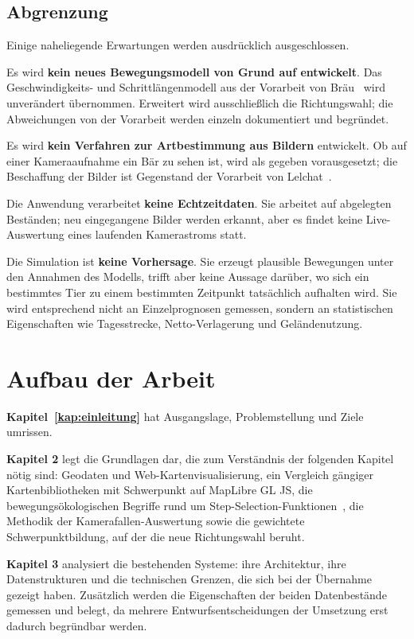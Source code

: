 \documentclass[12pt,a4paper]{scrreprt}
\begin{document}
\subsection*{Abgrenzung}

Einige naheliegende Erwartungen werden ausdrücklich ausgeschlossen.

Es wird \textbf{kein neues Bewegungsmodell von Grund auf entwickelt}.
Das Geschwindigkeits- und Schrittlängenmodell aus der Vorarbeit von
Bräu~\cite{braeu2025} wird unverändert übernommen. Erweitert wird
ausschließlich die Richtungswahl; die Abweichungen von der Vorarbeit
werden einzeln dokumentiert und begründet.

Es wird \textbf{kein Verfahren zur Artbestimmung aus Bildern}
entwickelt. Ob auf einer Kameraaufnahme ein Bär zu sehen ist, wird als
gegeben vorausgesetzt; die Beschaffung der Bilder ist Gegenstand der
Vorarbeit von Lelchat~\cite{lelchat2026}.

Die Anwendung verarbeitet \textbf{keine Echtzeitdaten}. Sie arbeitet
auf abgelegten Beständen; neu eingegangene Bilder werden erkannt, aber
es findet keine Live-Auswertung eines laufenden Kamerastroms statt.

Die Simulation ist \textbf{keine Vorhersage}. Sie erzeugt plausible
Bewegungen unter den Annahmen des Modells, trifft aber keine Aussage
darüber, wo sich ein bestimmtes Tier zu einem bestimmten Zeitpunkt
tatsächlich aufhalten wird. Sie wird entsprechend nicht an
Einzelprognosen gemessen, sondern an statistischen Eigenschaften wie
Tagesstrecke, Netto-Verlagerung und Geländenutzung.

\section{Aufbau der Arbeit}
\label{sec:aufbau}

\textbf{Kapitel~\ref{kap:einleitung}} hat Ausgangslage, Problemstellung
und Ziele umrissen.

\textbf{Kapitel 2} legt die Grundlagen dar, die zum Verständnis der
folgenden Kapitel nötig sind: Geodaten und Web-Kartenvisualisierung,
ein Vergleich gängiger Kartenbibliotheken mit Schwerpunkt auf MapLibre
GL JS, die bewegungsökologischen Begriffe rund um
Step-Selection-Funktionen~\cite{thurfjell2014}, die Methodik der
Kamerafallen-Auswertung sowie die gewichtete Schwerpunktbildung, auf
der die neue Richtungswahl beruht.

\textbf{Kapitel 3} analysiert die bestehenden Systeme: ihre Architektur,
ihre Datenstrukturen und die technischen Grenzen, die sich bei der
Übernahme gezeigt haben. Zusätzlich werden die Eigenschaften der beiden
Datenbestände gemessen und belegt, da mehrere Entwurfsentscheidungen
der Umsetzung erst dadurch begründbar werden.
\end{document}
